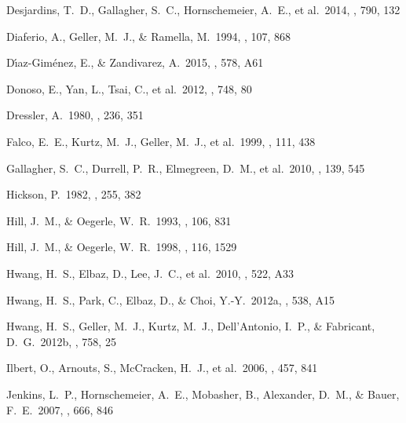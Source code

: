 \documentclass[12pt,preprint,apj]{emulateapj}
\begin{document}
\begin{thebibliography}{}
 Desjardins, T.~D., Gallagher, S.~C., Hornschemeier, A.~E., et al.\ 2014, \apj, 790, 132

 Diaferio, A., Geller, 
M.~J., \& Ramella, M.\ 1994, \aj, 107, 868 

 D{\'{\i}}az-Gim{\'e}nez, E., \& Zandivarez, A.\ 2015, \aap, 578, A61

 Donoso, E., Yan, L., Tsai, C., et al.\ 2012, \apj, 748, 80

 Dressler, A.\ 1980, \apj, 236, 351  

 Falco, E.~E., Kurtz, M.~J., Geller, M.~J., et al.\ 1999, \pasp, 111, 438 

 Gallagher, S.~C., Durrell, P.~R., Elmegreen, D.~M., et al.\ 2010, \aj, 139, 545 


 Hickson, P.\ 1982, \apj, 255, 
382 

 Hill, J.~M., \& Oegerle, W.~R.\ 1993, \aj, 106, 831 

 Hill, J.~M., \& Oegerle, W.~R.\ 1998, \aj, 116, 1529



 Hwang, H.~S., Elbaz, D., Lee, J.~C., et al.\ 2010, \aap, 522, A33

 Hwang, H.~S., Park, C., Elbaz, D., \& Choi, Y.-Y.\ 2012a, \aap, 538, A15 

 Hwang, H.~S., Geller, M.~J., Kurtz, M.~J., Dell'Antonio, I.~P., \& Fabricant, D.~G.\ 2012b, \apj, 758, 25

 Ilbert, O., Arnouts, S., McCracken, H.~J., et al.\ 2006, \aap, 457, 841 

 Jenkins, L.~P., Hornschemeier, A.~E., Mobasher, B., Alexander, D.~M., \& Bauer, F.~E.\ 2007, \apj, 666, 846


\end{thebibliography}
\end{document}
